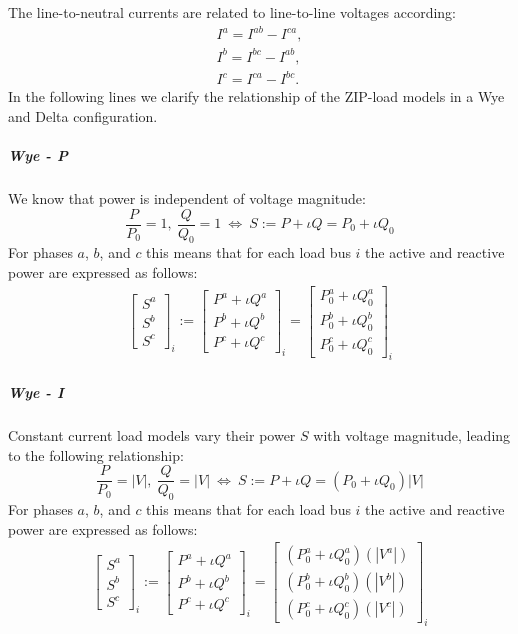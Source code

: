 \documentclass[10pt,journal]{article}
\begin{document}
The line-to-neutral currents are related to line-to-line voltages according: 
\begin{align}
    I^a=I^{ab}-I^{ca},\\
    I^b=I^{bc}-I^{ab},\\
    I^c=I^{ca}-I^{bc}.
\end{align}
In the following lines we clarify the relationship of the ZIP-load models in a Wye and Delta configuration. 
\subparagraph{Wye - P}
We know that power is independent of voltage magnitude: \begin{equation}
    \frac{P}{P_0}=1,\ \frac{Q}{Q_0}=1\ \Leftrightarrow\ S := P +\iota Q = P_0 + \iota Q_0
\end{equation}
For phases $a$, $b$, and $c$ this means that for each load bus $i$ the active and reactive power are expressed as follows: 
\begin{align}
    \begin{bmatrix}
    S^a\\
    S^b\\
    S^c
    \end{bmatrix}_i := \begin{bmatrix}
    P^a +\iota Q^a\\
    P^b +\iota Q^b\\
    P^c +\iota Q^c
    \end{bmatrix}_i = \begin{bmatrix}
    P^a_0 +\iota Q^a_0\\
    P^b_0 +\iota Q^b_0\\
    P^c_0 +\iota Q^c_0
    \end{bmatrix}_i 
\end{align}
\subparagraph{Wye - I}
Constant current load models vary their power $S$ with voltage magnitude, leading to the following relationship: 
\begin{equation}
    \frac{P}{P_0}=|V|,\ \frac{Q}{Q_0}=|V|\ \Leftrightarrow\ S := P +\iota Q = (P_0 + \iota Q_0)|V|
\end{equation}
For phases $a$, $b$, and $c$ this means that for each load bus $i$ the active and reactive power are expressed as follows: 
\begin{align}
    \begin{bmatrix}
    S^a\\
    S^b\\
    S^c
    \end{bmatrix}_i := \begin{bmatrix}
    P^a +\iota Q^a\\
    P^b +\iota Q^b\\
    P^c +\iota Q^c
    \end{bmatrix}_i = \begin{bmatrix}
    (P^a_0 +\iota Q^a_0)(|V^a|)\\
    (P^b_0 +\iota Q^b_0)(|V^b|)\\
    (P^c_0 +\iota Q^c_0)(|V^c|)
    \end{bmatrix}_i 
\end{align}
\end{document}
